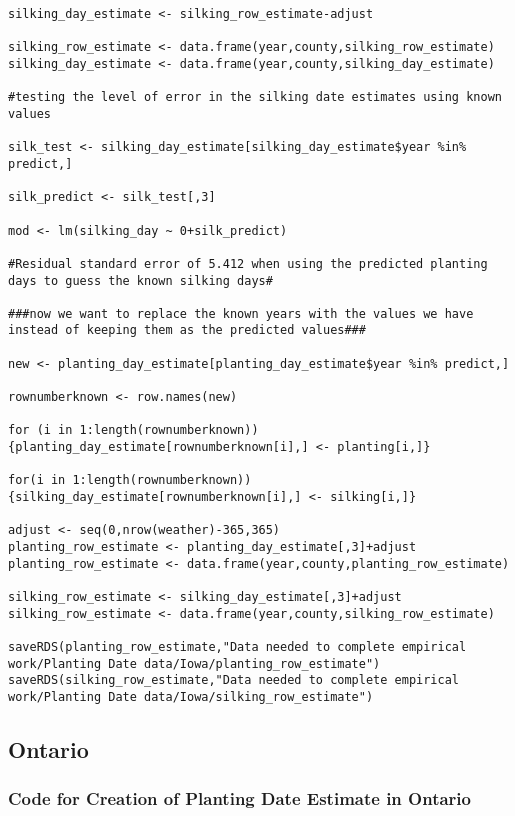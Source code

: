 \begin{lstlisting}
silking_day_estimate <- silking_row_estimate-adjust

silking_row_estimate <- data.frame(year,county,silking_row_estimate)
silking_day_estimate <- data.frame(year,county,silking_day_estimate)

#testing the level of error in the silking date estimates using known values

silk_test <- silking_day_estimate[silking_day_estimate$year %in% predict,]

silk_predict <- silk_test[,3]

mod <- lm(silking_day ~ 0+silk_predict)

#Residual standard error of 5.412 when using the predicted planting days to guess the known silking days#

###now we want to replace the known years with the values we have instead of keeping them as the predicted values###

new <- planting_day_estimate[planting_day_estimate$year %in% predict,]

rownumberknown <- row.names(new)

for (i in 1:length(rownumberknown))
{planting_day_estimate[rownumberknown[i],] <- planting[i,]}

for(i in 1:length(rownumberknown))
{silking_day_estimate[rownumberknown[i],] <- silking[i,]}

adjust <- seq(0,nrow(weather)-365,365)
planting_row_estimate <- planting_day_estimate[,3]+adjust
planting_row_estimate <- data.frame(year,county,planting_row_estimate)

silking_row_estimate <- silking_day_estimate[,3]+adjust
silking_row_estimate <- data.frame(year,county,silking_row_estimate)

saveRDS(planting_row_estimate,"Data needed to complete empirical work/Planting Date data/Iowa/planting_row_estimate")
saveRDS(silking_row_estimate,"Data needed to complete empirical work/Planting Date data/Iowa/silking_row_estimate")

\end{lstlisting}


\subsection{Ontario}

\subsubsection{Code for Creation of Planting Date Estimate in Ontario}

